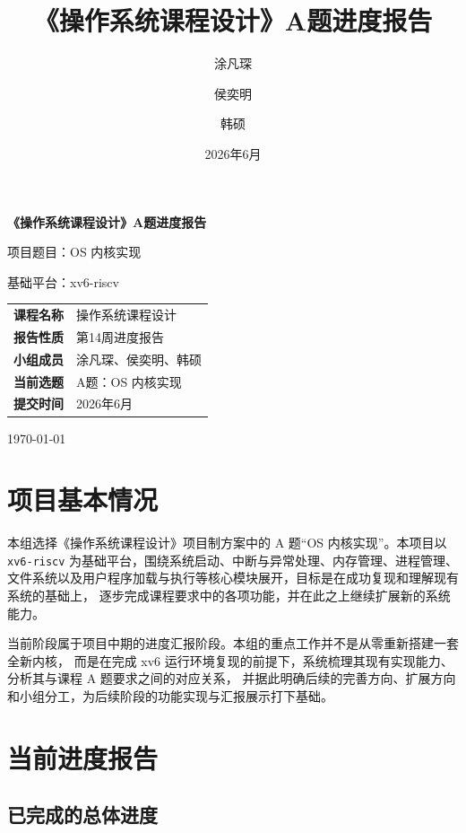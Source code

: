 \documentclass[12pt,a4paper]{ctexart}
\title{\textbf{《操作系统课程设计》A题进度报告}}
\author{涂凡琛 \and 侯奕明 \and 韩硕}
\date{2026年6月}
\begin{document}
\begin{titlepage}
  \centering
  \vspace*{3.5cm}

  {\bfseries 《操作系统课程设计》A题进度报告\par}
  \vspace{1.2cm}
  {项目题目：OS 内核实现\par}
  \vspace{0.6cm}
  {基础平台：xv6-riscv\par}
  \vspace{1.6cm}

  \renewcommand{\arraystretch}{1.5}
  \begin{tabular}{>{\bfseries}p{3.2cm}p{8.5cm}}
    课程名称 & 操作系统课程设计 \\
    报告性质 & 第14周进度报告 \\
    小组成员 & 涂凡琛、侯奕明、韩硕 \\
    当前选题 & A题：OS 内核实现 \\
    提交时间 & 2026年6月 \\
  \end{tabular}

  \vfill
  {\large \today\par}
\end{titlepage}

\tableofcontents
\newpage

\section{项目基本情况}

本组选择《操作系统课程设计》项目制方案中的 A 题“OS 内核实现”。本项目以
\texttt{xv6-riscv} 为基础平台，围绕系统启动、中断与异常处理、内存管理、进程管理、
文件系统以及用户程序加载与执行等核心模块展开，目标是在成功复现和理解现有系统的基础上，
逐步完成课程要求中的各项功能，并在此之上继续扩展新的系统能力。

当前阶段属于项目中期的进度汇报阶段。本组的重点工作并不是从零重新搭建一套全新内核，
而是在完成 xv6 运行环境复现的前提下，系统梳理其现有实现能力、分析其与课程 A 题要求之间的对应关系，
并据此明确后续的完善方向、扩展方向和小组分工，为后续阶段的功能实现与汇报展示打下基础。

\section{当前进度报告}

\subsection{已完成的总体进度}
\end{document}
